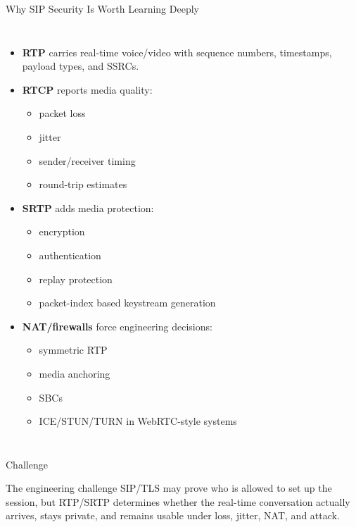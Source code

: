 \documentclass[aspectratio=169]{beamer}
\begin{document}
\begin{frame}{Why SIP Security Is Worth Learning Deeply}
\begin{columns}[T]
\begin{itemize}
    \item \textbf{RTP} carries real-time voice/video with sequence numbers, timestamps, payload types, and SSRCs.
    \item \textbf{RTCP} reports media quality:
    \begin{itemize}
        \tiny
        \item packet loss
        \item jitter
        \item sender/receiver timing
        \item round-trip estimates
    \end{itemize}
    \item \textbf{SRTP} adds media protection:
    \begin{itemize}
        \tiny
        \item encryption
        \item authentication
        \item replay protection
        \item packet-index based keystream generation
    \end{itemize}
    \item \textbf{NAT/firewalls} force engineering decisions:
    \begin{itemize}
        \tiny
        \item symmetric RTP
        \item media anchoring
        \item SBCs
        \item ICE/STUN/TURN in WebRTC-style systems
    \end{itemize}
\end{itemize}

\end{columns}

\end{frame}

\begin{frame}{Challenge}

\begin{alertblock}{The engineering challenge}
\centering
SIP/TLS may prove who is allowed to set up the session, but RTP/SRTP determines whether the real-time conversation actually arrives, stays private, and remains usable under loss, jitter, NAT, and attack.
\end{alertblock}

\end{frame}
\end{document}

